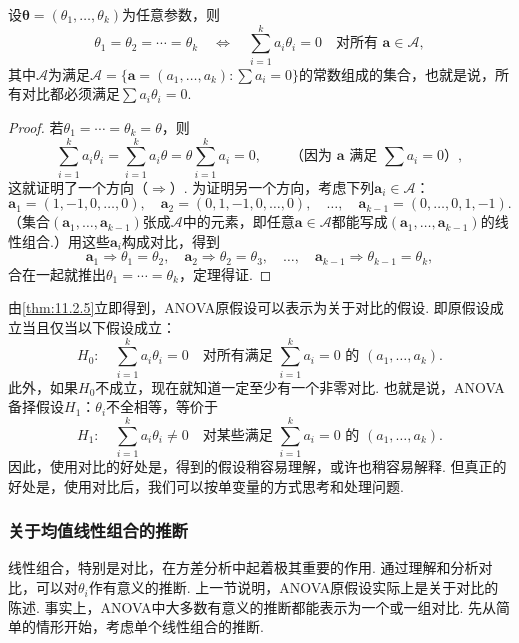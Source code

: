 \begin{theorem}\label{thm:11.2.5}
设$\boldsymbol\theta=(\theta_1,\ldots,\theta_k)$为任意参数，则
$$
\theta_1=\theta_2=\cdots=\theta_k
\quad\Longleftrightarrow\quad
\sum_{i=1}^k a_i\theta_i=0\quad\text{对所有 }\boldsymbol a\in\mathcal A,
$$
其中$\mathcal A$为满足$\mathcal A=\{\boldsymbol a=(a_1,\ldots,a_k):\sum a_i=0\}$的常数组成的集合，也就是说，所有对比都必须满足$\sum a_i\theta_i=0$.
\end{theorem}
\begin{proof}
若$\theta_1=\cdots=\theta_k=\theta$，则
$$
\sum_{i=1}^k a_i\theta_i=\sum_{i=1}^k a_i\theta
=\theta\sum_{i=1}^k a_i=0,
\qquad\text{（因为 }\boldsymbol a\text{ 满足 }\sum a_i=0\text{）},
$$
这就证明了一个方向（$\Rightarrow$）. 为证明另一个方向，考虑下列$\boldsymbol a_i\in\mathcal A$：
$$
\boldsymbol a_1=(1,-1,0,\ldots,0),\quad
\boldsymbol a_2=(0,1,-1,0,\ldots,0),\quad\ldots,\quad
\boldsymbol a_{k-1}=(0,\ldots,0,1,-1).
$$
（集合$(\boldsymbol a_1,\ldots,\boldsymbol a_{k-1})$张成$\mathcal A$中的元素，即任意$\boldsymbol a\in\mathcal A$都能写成$(\boldsymbol a_1,\ldots,\boldsymbol a_{k-1})$的线性组合.）用这些$\boldsymbol a_i$构成对比，得到
$$
\boldsymbol a_1\Rightarrow\theta_1=\theta_2,\quad
\boldsymbol a_2\Rightarrow\theta_2=\theta_3,\quad\ldots,\quad
\boldsymbol a_{k-1}\Rightarrow\theta_{k-1}=\theta_k,
$$
合在一起就推出$\theta_1=\cdots=\theta_k$，定理得证.
\end{proof}

由\autoref{thm:11.2.5}立即得到，ANOVA原假设可以表示为关于对比的假设. 即原假设成立当且仅当以下假设成立：
$$
H_0:\quad\sum_{i=1}^k a_i\theta_i=0
\quad\text{对所有满足 }\sum_{i=1}^k a_i=0\text{ 的 }(a_1,\ldots,a_k).
$$
此外，如果$H_0$不成立，现在就知道一定至少有一个非零对比. 也就是说，ANOVA备择假设$H_1$：$\theta_i$不全相等，等价于
$$
H_1:\quad\sum_{i=1}^k a_i\theta_i\ne0
\quad\text{对某些满足 }\sum_{i=1}^k a_i=0\text{ 的 }(a_1,\ldots,a_k).
$$
因此，使用对比的好处是，得到的假设稍容易理解，或许也稍容易解释. 但真正的好处是，使用对比后，我们可以按单变量的方式思考和处理问题.

\subsubsection{关于均值线性组合的推断}\label{sec:11.2.3}
线性组合，特别是对比，在方差分析中起着极其重要的作用. 通过理解和分析对比，可以对$\theta_i$作有意义的推断. 上一节说明，ANOVA原假设实际上是关于对比的陈述. 事实上，ANOVA中大多数有意义的推断都能表示为一个或一组对比. 先从简单的情形开始，考虑单个线性组合的推断.

